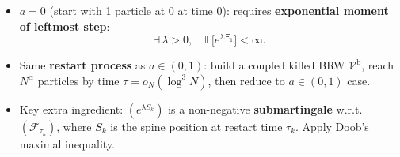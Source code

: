 \begin{itemize}
    \item $a=0$ (start with 1 particle at $0$ at time $0$): requires \textbf{exponential moment of leftmost step}:
    \[
        \exists\,\lambda>0,\quad \mathbb E\big[e^{\lambda\Xi_1}\big]<\infty.
    \]
    \item Same \textbf{restart process} as $a\in(0,1)$: build a coupled killed BRW $\mathcal V^{\mathrm b}$,
          reach $N^\alpha$ particles by time $\tau=o_N(\log^3 N)$, then reduce to $a\in(0,1)$ case.
    \item Key extra ingredient: $(e^{\lambda S_k})$ is a non-negative \textbf{submartingale} w.r.t.\ $(\mathscr F_{\tau_k})$,
          where $S_k$ is the spine position at restart time $\tau_k$. Apply Doob's maximal inequality.
\end{itemize}
